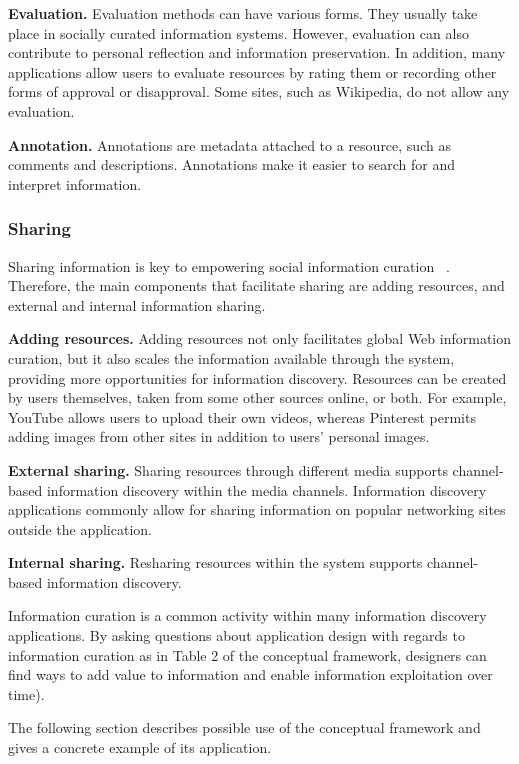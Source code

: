\documentclass{casconpaper}
\begin{document}
{{\textbf{Evaluation.} Evaluation methods can have various forms. They usually take place in socially curated information systems. However, evaluation can also contribute to personal reflection and information preservation. In addition, many applications allow users to evaluate resources by rating them or recording other forms of approval or disapproval. Some sites, such as Wikipedia, do not allow any evaluation. 

\textbf{Annotation.} Annotations are metadata attached to a resource, such as comments and descriptions. Annotations make it easier to search for and interpret information. 
} %

{\subsubsection{Sharing}
Sharing information is key to empowering social information curation ~\cite{beagrie}. Therefore, the main components that facilitate sharing are adding resources, and external and internal information sharing.

\textbf{Adding resources.} Adding resources not only facilitates global Web information curation, but it also scales the information available through the system, providing more opportunities for information discovery. Resources can be created by users themselves, taken from some other sources online, or both. For example, YouTube allows users to upload their own videos, whereas Pinterest permits adding images from other sites in addition to users' personal images. 

\textbf{External sharing.} Sharing resources through different media supports channel-based information discovery within the media channels. Information discovery applications commonly allow for sharing information on popular networking sites outside the application.

\textbf{Internal sharing.} Resharing resources within the system supports channel-based information discovery. 
} %

Information curation is a common activity within many information discovery applications. By asking questions about application design with regards to information curation as in Table 2 of the conceptual framework, designers can find ways to add value to information and enable information exploitation over time).

The following section describes possible use of the conceptual framework and gives a concrete example of its application.

}
\end{document}
